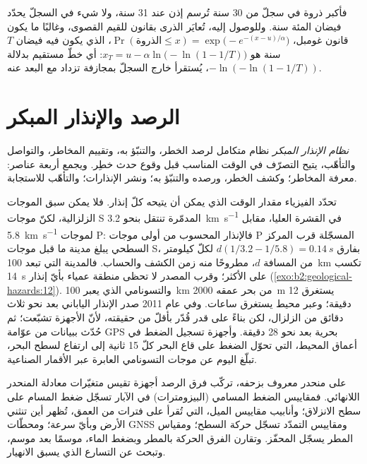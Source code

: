 فأكبر ذروة في سجلّ من 30 سنة تُرسم إذن عند 31 سنة، ولا شيء في السجلّ يحدّد
فيضان المئة سنة. وللوصول إليه، تُعايَر الذرى بقانون للقيم القصوى، وغالبًا ما يكون قانون غومبل،
$\Pr(\text{الذروة} \leq x) = \exp\bigl(-e^{-(x - u)/\alpha}\bigr)$، الذي يكون فيه فيضان $T$ سنة هو $x_T = u
- \alpha\ln\bigl(-\ln(1 - 1/T)\bigr)$: أي خطّ مستقيم بدلالة $-\ln(-\ln(1 - 1/T))$، يُستقرأ
خارج السجلّ بمجازفة تزداد مع البعد عنه.

\section{الرصد والإنذار المبكر}\label{sec:b2:geological-hazards:warning}

\begin{definition}\label{def:b2:geological-hazards:warning}
\emph{نظام الإنذار المبكر} نظام متكامل لرصد الخطر،
والتنبّؤ به، وتقييم المخاطر، والتواصل والتأهّب، يتيح التصرّف في الوقت المناسب
قبل وقوع حدث خطِر. ويجمع أربعة عناصر: معرفة المخاطر؛ وكشف الخطر،
ورصده والتنبّؤ به؛ ونشر الإنذارات؛ والتأهّب
للاستجابة.
\end{definition}

تحدّد الفيزياء مقدار الوقت الذي يمكن أن يتيحه كلّ إنذار. فلا يمكن سبق الموجات الزلزالية، لكنّ
موجات S المدمّرة تنتقل بنحو \qty{3.2}{km.s^{-1}} في القشرة العليا، مقابل \qty{5.8}{km.s^{-1}} لموجات
P: فالإنذار المحسوب من أولى موجات P المسجّلة قرب المركز السطحي يبلغ مدينة ما
قبل موجات S، بفارق $d(1/3.2 - 1/5.8) = \qty{0.14}{s}$ لكلّ كيلومتر من المسافة $d$، مطروحًا منه
زمن الكشف والحساب. فالمدينة التي تبعد \qty{100}{km} تكسب \qty{14}{s} على الأكثر؛ وقرب المصدر
لا تحظى منطقة عمياء بأيّ إنذار (\cref{exo:b2:geological-hazards:12}). والتسونامي الذي يعبر \qty{100}{km} من بحر
عمقه \qty{2000}{m} يستغرق 12 دقيقة؛ وعبر محيط يستغرق ساعات. وفي عام 2011 صدر الإنذار
الياباني بعد نحو ثلاث دقائق من الزلزال، لكن بناءً على قدر قُدّر بأقلّ من حقيقته،
لأنّ الأجهزة تشبّعت؛ ثم حُدّث ببيانات من عوّامة GPS بحرية بعد نحو 28 دقيقة.
وأجهزة تسجيل الضغط في أعماق المحيط، التي تحوّل الضغط على قاع البحر كلّ 15 ثانية إلى
ارتفاع لسطح البحر، تبلّغ اليوم عن موجات التسونامي العابرة عبر الأقمار الصناعية.

\begin{inthefield}
على منحدر معروف بزحفه، تركّب فرق الرصد أجهزة تقيس متغيّرات
معادلة المنحدر اللانهائي. فمقاييس الضغط المسامي (البيزومترات) في الآبار تسجّل ضغط المسام على سطح الانزلاق؛
وأنابيب مقاييس الميل، التي تُقرأ على فترات من العمق، تُظهر أين تنثني الأرض وبأيّ سرعة؛ ومحطّات
GNSS ومقاييس التمدّد تسجّل حركة السطح؛ ومقياس المطر يسجّل المحفّز.
وتقارن الفرق الحركة بالمطر وبضغط الماء، موسمًا بعد موسم، وتبحث
عن التسارع الذي يسبق الانهيار.
\end{inthefield}

